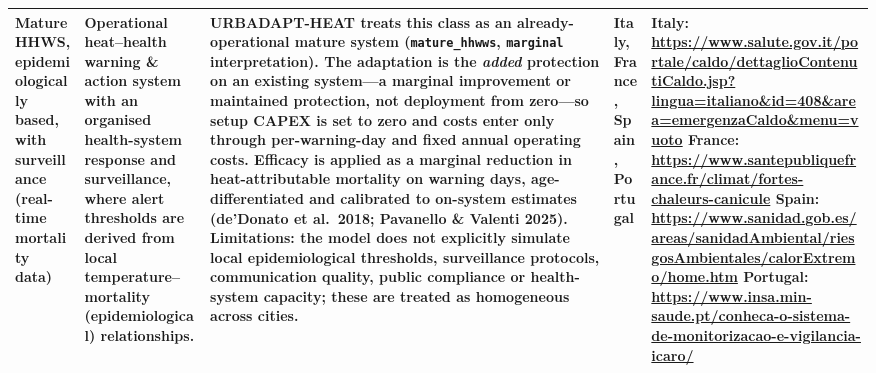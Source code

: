 \begin{landscape}
\begin{longtable}{@{}L{2.3cm}L{3.3cm}L{7.6cm}L{2.4cm}L{5.0cm}@{}}
Mature HHWS, epidemiologically based, with surveillance (real-time mortality data)
&
Operational heat--health warning \& action system with an organised health-system response and surveillance, where alert thresholds are derived from local temperature--mortality (epidemiological) relationships.
&
URBADAPT-HEAT treats this class as an already-operational mature system (\texttt{mature\_hhwws}, \texttt{marginal} interpretation). The adaptation is the \emph{added} protection on an existing system---a marginal improvement or maintained protection, not deployment from zero---so setup CAPEX is set to zero and costs enter only through per-warning-day and fixed annual operating costs. Efficacy is applied as a marginal reduction in heat-attributable mortality on warning days, age-differentiated and calibrated to on-system estimates (de'Donato et al.\ 2018; Pavanello \& Valenti 2025). \textbf{Limitations:} the model does not explicitly simulate local epidemiological thresholds, surveillance protocols, communication quality, public compliance or health-system capacity; these are treated as homogeneous across cities.
&
Italy, France, Spain, Portugal
&
\scriptsize Italy: \url{https://www.salute.gov.it/portale/caldo/dettaglioContenutiCaldo.jsp?lingua=italiano&id=408&area=emergenzaCaldo&menu=vuoto}\newline
France: \url{https://www.santepubliquefrance.fr/climat/fortes-chaleurs-canicule}\newline
Spain: \url{https://www.sanidad.gob.es/areas/sanidadAmbiental/riesgosAmbientales/calorExtremo/home.htm}\newline
Portugal: \url{https://www.insa.min-saude.pt/conheca-o-sistema-de-monitorizacao-e-vigilancia-icaro/}
\\
\midrule


\end{longtable}
\end{landscape}
